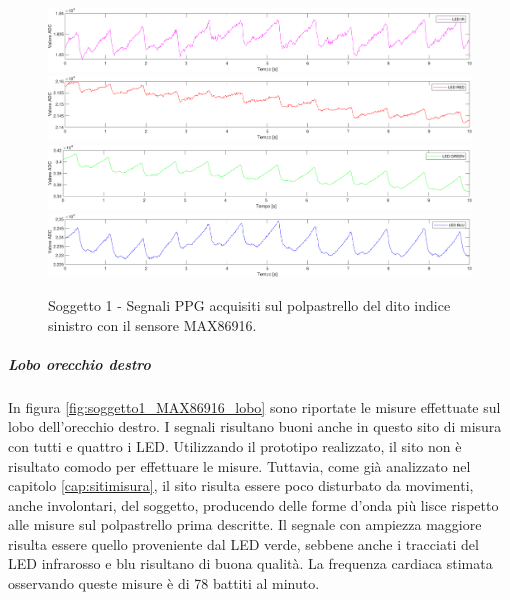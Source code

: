 \begin{figure}[h]
	\centering
	\includegraphics[width=1\linewidth]{ImageFiles/Misure Preliminari/Soggetto 1/MAX86916/polpastrello_ired}
	\includegraphics[width=1\linewidth]{ImageFiles/Misure Preliminari/Soggetto 1/MAX86916/polpastrello_red}
	\includegraphics[width=1\linewidth]{ImageFiles/Misure Preliminari/Soggetto 1/MAX86916/polpastrello_green}
	\includegraphics[width=1\linewidth]{ImageFiles/Misure Preliminari/Soggetto 1/MAX86916/polpastrello_blu}
	\caption{Soggetto 1 - Segnali PPG acquisiti sul polpastrello del dito indice sinistro con il sensore MAX86916.}
	\label{fig:soggetto1_MAX86916_polpastrello}
\end{figure}

\clearpage

\subparagraph{Lobo orecchio destro}

In figura \ref{fig:soggetto1_MAX86916_lobo} sono riportate le misure effettuate sul lobo dell'orecchio destro. I segnali risultano buoni anche in questo sito di misura con tutti e quattro i LED. Utilizzando il prototipo realizzato, il sito non è risultato comodo per effettuare le misure. Tuttavia, come già analizzato nel capitolo \ref{cap:sitimisura}, il sito risulta essere poco disturbato da movimenti, anche involontari, del soggetto, producendo delle forme d'onda più lisce rispetto alle misure sul polpastrello prima descritte. Il segnale con ampiezza maggiore risulta essere quello proveniente dal LED verde, sebbene anche i tracciati del LED infrarosso e blu risultano di buona qualità. La frequenza cardiaca stimata osservando queste misure è di 78 battiti al minuto.

